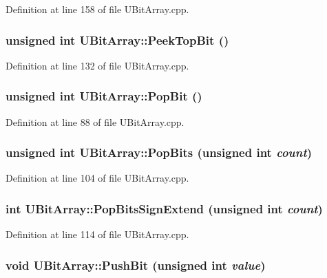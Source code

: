 Definition at line 158 of file UBitArray.cpp.\hypertarget{class_u_bit_array_e560511d0cc3b130dd181f9e6ce576f1}{
\subsubsection[{PeekTopBit}]{\setlength{\rightskip}{0pt plus 5cm}unsigned int UBitArray::PeekTopBit ()}}
\label{class_u_bit_array_e560511d0cc3b130dd181f9e6ce576f1}




Definition at line 132 of file UBitArray.cpp.\hypertarget{class_u_bit_array_6329080b1012d67e42fa707ad2d3473f}{
\subsubsection[{PopBit}]{\setlength{\rightskip}{0pt plus 5cm}unsigned int UBitArray::PopBit ()}}
\label{class_u_bit_array_6329080b1012d67e42fa707ad2d3473f}




Definition at line 88 of file UBitArray.cpp.\hypertarget{class_u_bit_array_cce4aede040372fb8c2db3e60d09b4f7}{
\subsubsection[{PopBits}]{\setlength{\rightskip}{0pt plus 5cm}unsigned int UBitArray::PopBits (unsigned int {\em count})}}
\label{class_u_bit_array_cce4aede040372fb8c2db3e60d09b4f7}




Definition at line 104 of file UBitArray.cpp.\hypertarget{class_u_bit_array_03fdd22136b0cb1db321c9ded22d6d04}{
\subsubsection[{PopBitsSignExtend}]{\setlength{\rightskip}{0pt plus 5cm}int UBitArray::PopBitsSignExtend (unsigned int {\em count})}}
\label{class_u_bit_array_03fdd22136b0cb1db321c9ded22d6d04}




Definition at line 114 of file UBitArray.cpp.\hypertarget{class_u_bit_array_65be0cc53c2ee958106162939cfd303a}{
\subsubsection[{PushBit}]{\setlength{\rightskip}{0pt plus 5cm}void UBitArray::PushBit (unsigned int {\em value})}}
\label{class_u_bit_array_65be0cc53c2ee958106162939cfd303a}




